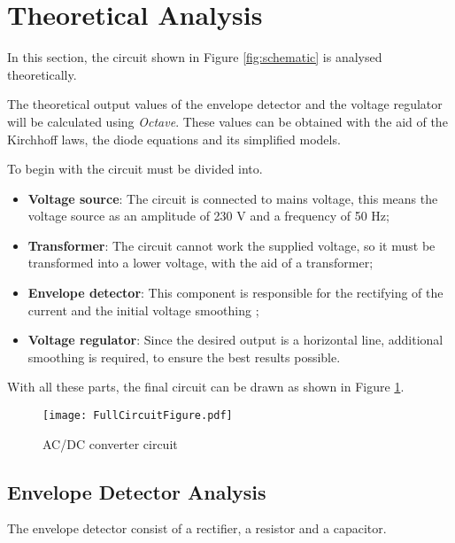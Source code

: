 \section{Theoretical Analysis}
\label{sec:analysis}
\indent


In this section, the circuit shown in Figure \ref{fig:schematic} is analysed theoretically.

The theoretical output values of the envelope detector and the voltage regulator will be calculated using {\it Octave}. These values can be obtained with the aid of the Kirchhoff laws, the diode equations and its simplified models.

To begin with the circuit must be divided into.

\begin{itemize}
    \item \textbf{Voltage source}: The circuit is connected to mains voltage, this means the voltage source as an amplitude of 230 V and a frequency of 50 Hz;
    \item \textbf{Transformer}: The circuit cannot work the supplied voltage, so it must be transformed into a lower voltage, with the aid of a transformer;
    \item \textbf{Envelope detector}: This component is responsible for the rectifying of the current and the initial voltage smoothing ;
    \item \textbf{Voltage regulator}: Since the desired output is a horizontal line, additional smoothing is required, to ensure the best results possible.
\end{itemize}

With all these parts, the final circuit can be drawn as shown in Figure \ref{fig:Circuit}.


\begin{figure}[h!]
    \centering
    \texttt{[image: FullCircuitFigure.pdf]}
    \caption{AC/DC converter circuit}
    \label{fig:Circuit}
\end{figure}


\subsection{Envelope Detector Analysis}
\label{subsection:ED_analysis}
\indent

The envelope detector consist of a rectifier, a resistor and a capacitor. 


